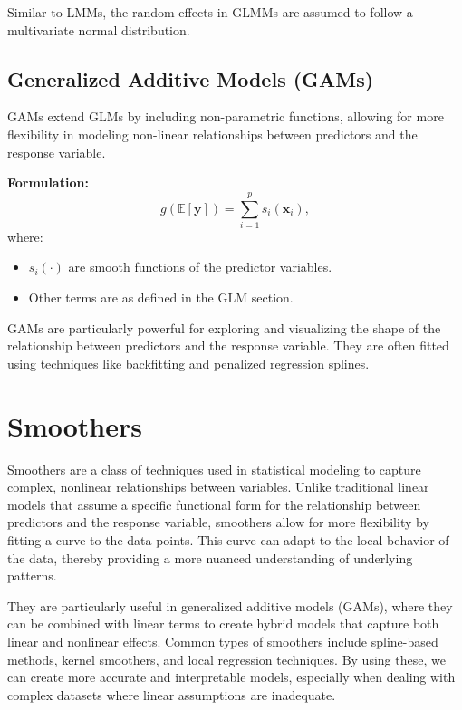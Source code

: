 \documentclass[12pt, twoside,hidelinks]{article}
\theoremstyle{definition}
\numberwithin{equation}{section}
\begin{document}
Similar to LMMs, the random effects in GLMMs are assumed to follow a multivariate normal distribution.

\subsection{Generalized Additive Models (GAMs)}

GAMs extend GLMs by including non-parametric functions, allowing for more flexibility in modeling non-linear relationships between predictors and the response variable.

\textbf{Formulation:}
\begin{equation}
    g(\mathbb{E}[\mathbf{y}]) = \sum_{i=1}^{p} s_i(\mathbf{x}_i),
    \label{eq:gam_general_form}
\end{equation}
where:
\begin{itemize}
    \item \( s_i(\cdot) \) are smooth functions of the predictor variables.
    \item Other terms are as defined in the GLM section.
\end{itemize}

GAMs are particularly powerful for exploring and visualizing the shape of the relationship between predictors and the response variable. They are often fitted using techniques like backfitting and penalized regression splines.


\section{Smoothers}

Smoothers are a class of techniques used in statistical modeling to capture complex, nonlinear relationships between variables. Unlike traditional linear models that assume a specific functional form for the relationship between predictors and the response variable, smoothers allow for more flexibility by fitting a curve to the data points.
This curve can adapt to the local behavior of the data, thereby providing a more nuanced understanding of underlying patterns.
\newline

They are particularly useful in generalized additive models (GAMs), where they can be combined with linear terms to create hybrid models that capture both linear and nonlinear effects. Common types of smoothers include spline-based methods, kernel smoothers, and local regression techniques. By using these, we can create more accurate and interpretable models, especially when dealing with complex datasets where linear assumptions are inadequate.
\end{document}

